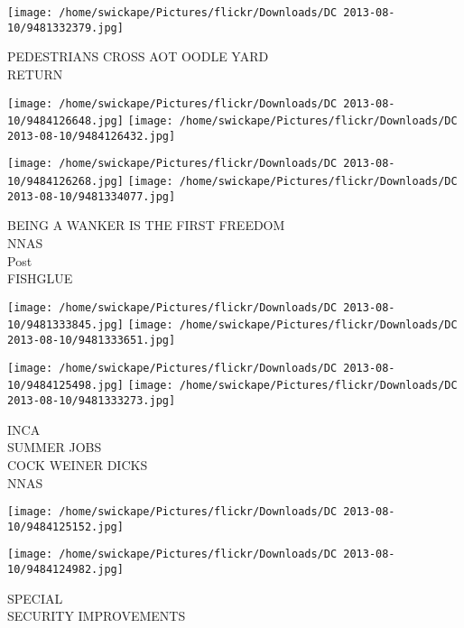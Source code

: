 \documentclass[10pt,letterpaper]{article}
\begin{document}
\vspace{0.25in}
\texttt{[image: /home/swickape/Pictures/flickr/Downloads/DC 2013-08-10/9481332379.jpg]}

PEDESTRIANS CROSS AOT OODLE YARD\\
RETURN\\
\pagebreak

\texttt{[image: /home/swickape/Pictures/flickr/Downloads/DC 2013-08-10/9484126648.jpg]}
\texttt{[image: /home/swickape/Pictures/flickr/Downloads/DC 2013-08-10/9484126432.jpg]}

\texttt{[image: /home/swickape/Pictures/flickr/Downloads/DC 2013-08-10/9484126268.jpg]}
\texttt{[image: /home/swickape/Pictures/flickr/Downloads/DC 2013-08-10/9481334077.jpg]}

BEING A WANKER IS THE FIRST FREEDOM\\
NNAS\\
Post\\
FISHGLUE\\
\pagebreak

\texttt{[image: /home/swickape/Pictures/flickr/Downloads/DC 2013-08-10/9481333845.jpg]}
\texttt{[image: /home/swickape/Pictures/flickr/Downloads/DC 2013-08-10/9481333651.jpg]}

\texttt{[image: /home/swickape/Pictures/flickr/Downloads/DC 2013-08-10/9484125498.jpg]}
\texttt{[image: /home/swickape/Pictures/flickr/Downloads/DC 2013-08-10/9481333273.jpg]}

INCA\\
SUMMER JOBS\\
COCK WEINER DICKS\\
NNAS\\
\pagebreak

\texttt{[image: /home/swickape/Pictures/flickr/Downloads/DC 2013-08-10/9484125152.jpg]}

\vspace{0.25in}
\texttt{[image: /home/swickape/Pictures/flickr/Downloads/DC 2013-08-10/9484124982.jpg]}

SPECIAL\\
SECURITY IMPROVEMENTS\\
\pagebreak
\end{document}
